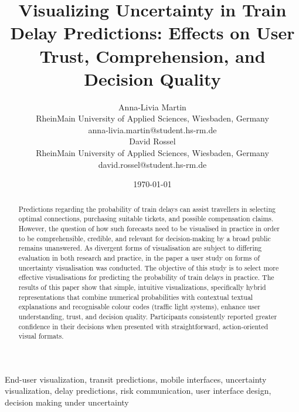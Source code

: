 \documentclass[final,journal,a4paper]{IEEEtran}
\newcommand{\titel}{Visualizing Uncertainty in Train Delay Predictions: Effects on User Trust, Comprehension, and Decision Quality}
\newcommand{\autorALM}{Anna-Livia Martin}
\newcommand{\autorDR}{David Rossel}
\newcommand{\hochschule}{RheinMain University of Applied Sciences}
\newcommand{\ort}{Wiesbaden, Germany}
\begin{document}
\title{\titel}

\author{
  \begin{minipage}[t]{0.45\textwidth}
    \centering
    \autorALM\\
    \hochschule, \ort\\
    anna-livia.martin@student.hs-rm.de
  \end{minipage}\hfill
  \begin{minipage}[t]{0.45\textwidth}
    \centering
    \autorDR\\
    \hochschule, \ort\\
    david.rossel@student.hs-rm.de
  \end{minipage}
}

\date{\today}

\maketitle

\begin{abstract}
Predictions regarding the probability of train delays can assist travellers in selecting optimal connections, purchasing suitable tickets, and possible compensation claims. However, the question of how such forecasts need to be visualised in practice in order to be comprehensible, credible, and relevant for decision-making by a broad public remains unanswered. As divergent forms of visualisation are subject to differing evaluation in both research and practice, in the paper a user study on forms of uncertainty visualisation was conducted. The objective of this study is to select more effective visualisations for predicting the probability of train delays in practice. The results of this paper show that simple, intuitive visualizations, specifically hybrid representations that combine numerical probabilities with contextual textual explanations and recognisable colour codes (traffic light systems), enhance user understanding, trust, and decision quality. Participants consistently reported greater confidence in their decisions when presented with straightforward, action-oriented visual formats.
\end{abstract}

\begin{IEEEkeywords}
End-user visualization, transit predictions, mobile interfaces, uncertainty visualization, delay predictions, risk communication, user interface design, decision making under uncertainty
\end{IEEEkeywords}
\end{document}
